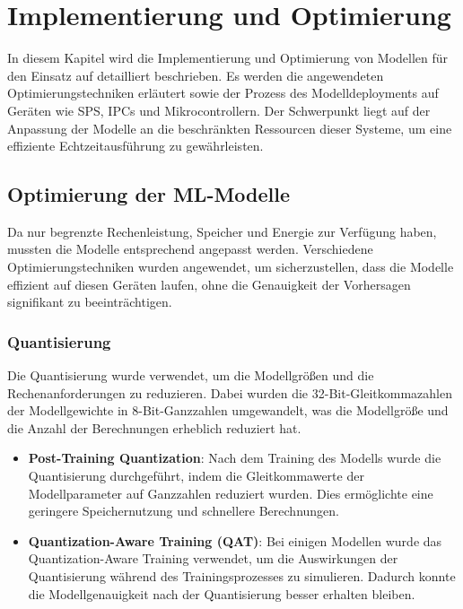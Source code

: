 \chapter{Implementierung und Optimierung}
\label{chap:implementierung_optimierung}

In diesem Kapitel wird die Implementierung und Optimierung von \ML Modellen für den Einsatz auf \Emb detailliert beschrieben. 
Es werden die angewendeten Optimierungstechniken erläutert sowie der Prozess des Modelldeployments auf Geräten wie SPS, IPCs und Mikrocontrollern. Der Schwerpunkt 
liegt auf der Anpassung der Modelle an die beschränkten Ressourcen dieser Systeme, um eine effiziente Echtzeitausführung zu gewährleisten.

\section{Optimierung der ML-Modelle}
Da \Emb nur begrenzte Rechenleistung, Speicher und Energie zur Verfügung haben, mussten die \ML Modelle entsprechend angepasst werden. 
Verschiedene Optimierungstechniken wurden angewendet, um sicherzustellen, dass die Modelle effizient auf diesen Geräten laufen, ohne die Genauigkeit der Vorhersagen 
signifikant zu beeinträchtigen.

\subsection{Quantisierung}
Die Quantisierung wurde verwendet, um die Modellgrößen und die Rechenanforderungen zu reduzieren. Dabei wurden die 32-Bit-Gleitkommazahlen der Modellgewichte in 
8-Bit-Ganzzahlen umgewandelt, was die Modellgröße und die Anzahl der Berechnungen erheblich reduziert hat.

\begin{itemize}
    \item \textbf{Post-Training Quantization}: Nach dem Training des Modells wurde die Quantisierung durchgeführt, indem die Gleitkommawerte der Modellparameter 
    auf Ganzzahlen reduziert wurden. Dies ermöglichte eine geringere Speichernutzung und schnellere Berechnungen.
    \item \textbf{Quantization-Aware Training (QAT)}: Bei einigen Modellen wurde das Quantization-Aware Training verwendet, um die Auswirkungen der Quantisierung 
    während des Trainingsprozesses zu simulieren. Dadurch konnte die Modellgenauigkeit nach der Quantisierung besser erhalten bleiben.
\end{itemize}

